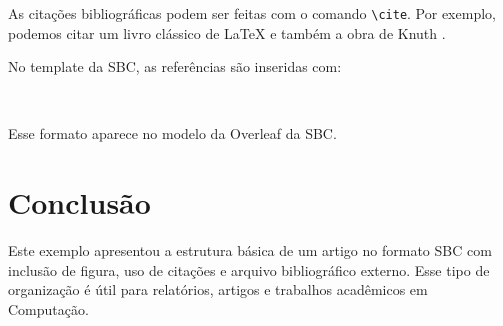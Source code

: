 \documentclass[12pt]{article}
\begin{document}
As citações bibliográficas podem ser feitas com o comando \verb|\cite|. Por exemplo,
podemos citar um livro clássico de \LaTeX{} \cite{lamport1994} e também a obra de
Knuth \cite{knuth1984}.

No template da SBC, as referências são inseridas com:

\begin{verbatim}


\end{verbatim}

Esse formato aparece no modelo da Overleaf da SBC.

\section{Conclusão}

Este exemplo apresentou a estrutura básica de um artigo no formato SBC com inclusão
de figura, uso de citações e arquivo bibliográfico externo. Esse tipo de organização é
útil para relatórios, artigos e trabalhos acadêmicos em Computação.



\end{document}
